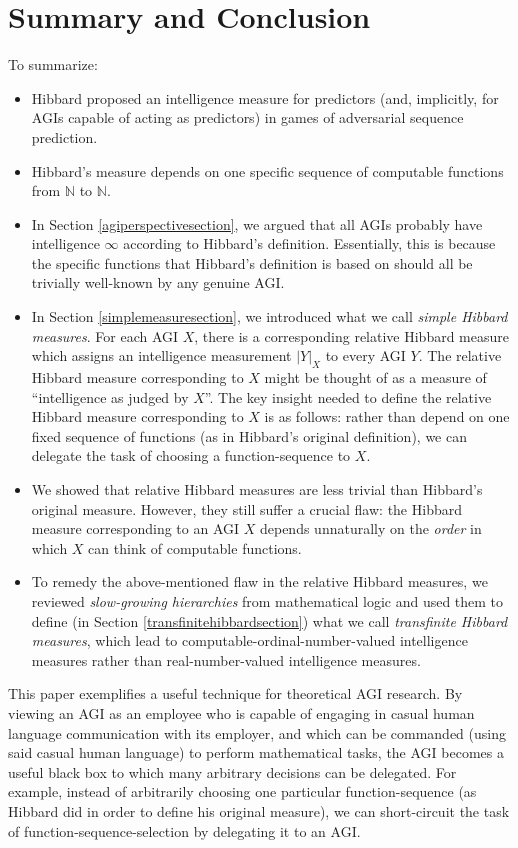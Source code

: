 \documentclass{article}
\begin{document}
\section{Summary and Conclusion}
\label{conclusionsection}

To summarize:
\begin{itemize}
    \item
    Hibbard proposed \cite{hibbard} an intelligence measure for predictors (and, implicitly,
    for AGIs capable of acting as predictors) in games of adversarial sequence prediction.
    \item
    Hibbard's measure depends on one specific sequence of computable functions
    from $\mathbb N$ to $\mathbb N$.
    \item
    In Section \ref{agiperspectivesection}, we argued that all AGIs probably have
    intelligence $\infty$ according to Hibbard's definition. Essentially, this is because
    the specific functions that Hibbard's definition is based on should all be trivially
    well-known by any genuine AGI.
    \item
    In Section \ref{simplemeasuresection}, we introduced what we call \emph{simple Hibbard
    measures}. For each AGI $X$, there is a corresponding relative Hibbard measure which
    assigns an intelligence measurement $|Y|_X$ to every AGI $Y$. The relative Hibbard
    measure corresponding to $X$ might be thought of as a measure of ``intelligence as
    judged by $X$''. The key insight needed to define the
    relative Hibbard measure corresponding
    to $X$ is as follows: rather than depend on one fixed sequence of functions (as in
    Hibbard's original definition), we can delegate the task of choosing a function-sequence
    to $X$.
    \item
    We showed that relative Hibbard measures are less trivial than Hibbard's original measure.
    However, they still suffer a crucial flaw: the Hibbard measure corresponding to an
    AGI $X$ depends unnaturally on the \emph{order} in which $X$ can think of
    computable functions.
    \item
    To remedy the above-mentioned flaw in the relative Hibbard measures, we reviewed
    \emph{slow-growing hierarchies} from mathematical logic and used them to define
    (in Section \ref{transfinitehibbardsection}) what
    we call \emph{transfinite Hibbard measures}, which lead to
    computable-ordinal-number-valued
    intelligence measures rather than real-number-valued intelligence measures.
\end{itemize}

This paper exemplifies a useful technique for theoretical AGI research.
By viewing an AGI as an employee who is capable of engaging in casual human
language communication with its employer, and which can be commanded (using said
casual human language) to perform mathematical tasks, the AGI becomes a useful
black box to which many arbitrary decisions can be delegated. For example, instead
of arbitrarily choosing one particular function-sequence (as Hibbard did in order
to define his original measure), we can short-circuit the task of
function-sequence-selection by delegating it to an AGI.




\end{document}
